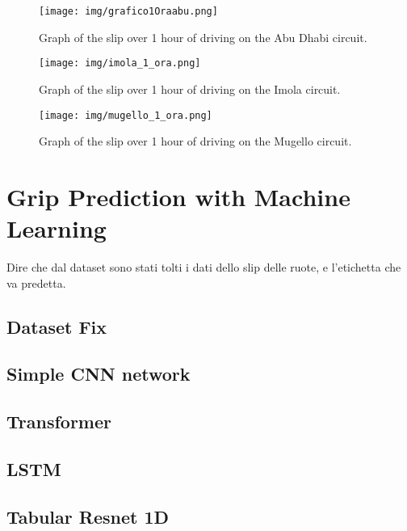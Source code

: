 \documentclass[a4paper,final,12pt]{report}
\begin{document}
\begin{figure}[H]
\centering
\texttt{[image: img/grafico1Oraabu.png]}
\caption{Graph of the slip over 1 hour of driving on the Abu Dhabi circuit.}
\label{fig:abu_1}
\end{figure}

\begin{figure}[H]
\centering
\texttt{[image: img/imola\_1\_ora.png]}
\caption{Graph of the slip over 1 hour of driving on the Imola circuit.}
\label{fig:imola_1}
\end{figure}

\begin{figure}[H]
\centering
\texttt{[image: img/mugello\_1\_ora.png]}
\caption{Graph of the slip over 1 hour of driving on the Mugello circuit.}
\label{fig:mugello_1}
\end{figure}

\newpage

\section{Grip Prediction with Machine Learning}
Dire che dal dataset sono stati tolti i dati dello slip delle ruote, e l'etichetta che va predetta.

\subsection{Dataset Fix}

\subsection{Simple CNN network}

\subsection{Transformer}

\subsection{LSTM}

\subsection{Tabular Resnet 1D}
\end{document}
